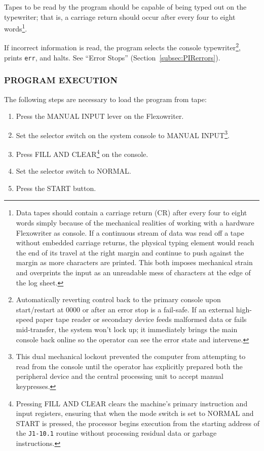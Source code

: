\begin{itemize}
Tapes to be read by the program should be capable of being typed out on the typewriter; that is, a carriage return should occur after every four to eight words\footnote{Data tapes should contain a carriage return (CR) after every four to eight words simply because of the mechanical realities of working with a hardware Flexowriter as console. If a continuous stream of data was read off a tape without embedded carriage returns, the physical typing element would reach the end of its travel at the right margin and continue to push against the margin as more characters are printed. This both imposes mechanical strain and overprints the input as an unreadable mess of characters at the edge of the log sheet.}.

If incorrect information is read, the program selects the console typewriter\footnote{Automatically reverting control back to the primary console upon start/restart at $0000$ or after an error stop is a fail-safe. If an external high-speed paper tape reader or secondary device feeds malformed data or fails mid-transfer, the system won't lock up; it immediately brings the main console back online so the operator can see the error state and intervene.}, prints \texttt{err}, and halts. See ``Error Stops'' (Section~\ref{subsec:PIRerrors}).
\end{itemize}

\subsubsection*{PROGRAM EXECUTION}
The following steps are necessary to load the program from tape:
\begin{enumerate}
  \item Press the \textsf{MANUAL INPUT} lever on the Flexowriter.
  \item Set the selector switch on the system console to \textsf{MANUAL INPUT}\footnote{This dual mechanical lockout prevented the computer from attempting to read from the console until the operator has explicitly prepared both the peripheral device and the central processing unit to accept manual keypresses.}.
  \item Press \textsf{FILL AND CLEAR}\footnote{Pressing \textsf{FILL AND CLEAR} clears the machine's primary instruction and input registers, ensuring that when the mode switch is set to \textsf{NORMAL} and \textsf{START} is pressed, the processor begins execution from the starting address of the \texttt{J1-10.1} routine without processing residual data or garbage instructions.} on the console.
  \item Set the selector switch to \textsf{NORMAL}.
  \item Press the \textsf{START} button.
\end{enumerate}

